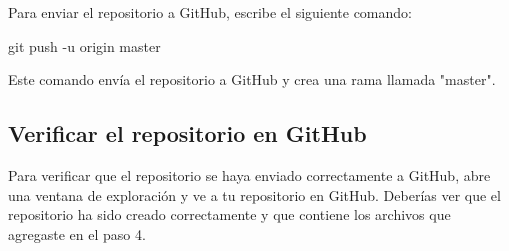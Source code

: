 Para enviar el repositorio a GitHub, escribe el siguiente comando: \begin{terbox} 
git push -u origin master 
\end{terbox} 

Este comando envía el repositorio a GitHub y crea una rama llamada "master".

\subsection{Verificar el repositorio en GitHub}

Para verificar que el repositorio se haya enviado correctamente a GitHub, abre una ventana de exploración y ve a tu repositorio en GitHub. Deberías ver que el repositorio ha sido creado correctamente y que contiene los archivos que agregaste en el paso 4.





